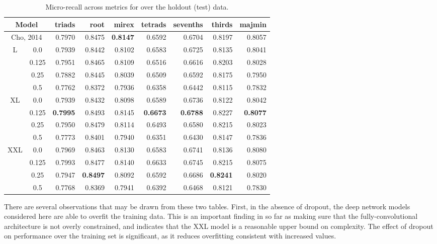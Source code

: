 \begin{table}[t]
\scriptsize
\begin{center}
\caption{Micro-recall across metrics for over the holdout (test) data.}
\label{tab:recall_test}
\begin{tabular}{cc|rrrrrrr}

\hline
\multicolumn{2}{c|}{Model}  & triads &   root &   mirex &   tetrads &   sevenths &   thirds &   majmin \\
\hline
\hline
\multicolumn{2}{c|}{Cho, 2014} &   0.7970 & 0.8475 &  \textbf{0.8147} &    0.6592 &     0.6704 &   0.8197 &   0.8057 \\
\hline
L & 0.0 &   0.7939 & 0.8442 &  0.8102 &    0.6583 &     0.6725 &   0.8135 &   0.8041 \\
  & 0.125 &   0.7951 & 0.8465 &  0.8109 &    0.6516 &     0.6616 &   0.8203 &   0.8028 \\
 & 0.25 &   0.7882 & 0.8445 &  0.8039 &    0.6509 &     0.6592 &   0.8175 &   0.7950 \\
  & 0.5 &   0.7762 & 0.8372 &  0.7936 &    0.6358 &     0.6442 &   0.8115 &   0.7832 \\
\hline
 XL &   0.0 &   0.7939 & 0.8432 &  0.8098 &    0.6589 &     0.6736 &   0.8122 &   0.8042 \\
  &  0.125 &   \textbf{0.7995} & 0.8493 &  0.8145 &    \textbf{0.6673} &     \textbf{0.6788} &   0.8227 &   \textbf{0.8077} \\
  &  0.25 &   0.7950 & 0.8479 &  0.8114 &    0.6493 &     0.6580 &   0.8215 &   0.8023 \\
  &  0.5 &   0.7773 & 0.8401 &  0.7940 &    0.6351 &     0.6430 &   0.8147 &   0.7836 \\
\hline
   XXL & 0.0 &   0.7969 & 0.8463 &  0.8130 &    0.6583 &     0.6741 &   0.8136 &   0.8080 \\
   &  0.125 &   0.7993 & 0.8477 &  0.8140 &    0.6633 &     0.6745 &   0.8215 &   0.8075 \\
   &  0.25 &   0.7947 & \textbf{0.8497} &  0.8092 &    0.6592 &     0.6686 &   \textbf{0.8241} &   0.8020 \\
   &  0.5 &   0.7768 & 0.8369 &  0.7941 &    0.6392 &     0.6468 &   0.8121 &   0.7830 \\
\hline
\end{tabular}
\end{center}
\end{table}

There are several observations that may be drawn from these two tables.
First, in the absence of dropout, the deep network models considered here are able to overfit the training data.
This is an important finding in so far as making sure that the fully-convolutional architecture is not overly constrained, and indicates that the XXL model is a reasonable upper bound on complexity.
The effect of dropout on performance over the training set is significant, as it reduces overfitting consistent with increased values.

